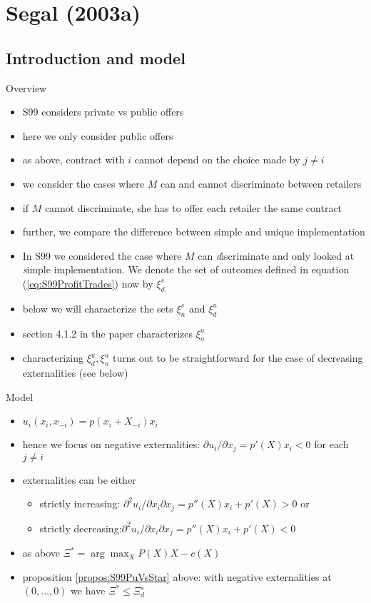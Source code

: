\documentclass[11pt,english]{beamer}
\newcommand{\dif}{\partial}
\begin{document}
\section{Segal (2003a)}

\subsection{Introduction and model}

\begin{frame}[allowframebreaks]{Overview}
  \begin{itemize}
  \item S99 considers private vs public offers
  \item here we only consider public offers
  \item as above, contract with $i$ cannot depend on the choice made
    by $j \neq i$
  \item we consider the cases where $M$ can and cannot discriminate
    between retailers
  \item if $M$ cannot discriminate, she has to offer each retailer the
    same contract
  \item further, we compare the difference between simple and unique implementation
  \item In S99 we considered the case where $M$ can \emph{d}iscriminate and
    only looked at \emph{s}imple implementation. We denote the set of
    outcomes defined in equation (\ref{eq:S99ProfitTrades}) now by $\xi_d^s$
  \item below we will characterize the sets $\xi_n^s$ and $\xi_d^u$
  \item section 4.1.2 in the paper characterizes $\xi_n^u$
  \item characterizing $\xi_d^u,\xi_n^u$ turns out to be
    straightforward for the case of decreasing externalities (see below)
  \end{itemize}
\end{frame}

\begin{frame}[allowframebreaks]{Model}
  \begin{itemize}
  \item $u_i(x_i,x_{-i})=p(x_i + X_{-i})x_i$
  \item hence we focus on negative externalities: $\dif u_i/\dif x_j =
    p'(X)x_i <0$ for each $j \neq i$
  \item externalities can be either
    \begin{itemize}
    \item strictly increasing: $\dif^2 u_i/\dif x_i \dif x_j = p''(X)x_i +p'(X)
      >0$ or
    \item strictly decreasing:$\dif^2 u_i/\dif x_i \dif x_j = p''(X)x_i +p'(X)
      <0$
    \end{itemize}
  \item as above $\Xi^* = \arg\max_X P(X)X-c(X)$
  \item proposition \ref{propos:S99PuVsStar} above: with negative
    externalities at $(0,\ldots,0)$ we have $\Xi^* \leq \Xi^s_d$
  \end{itemize}
\end{frame}
\end{document}
